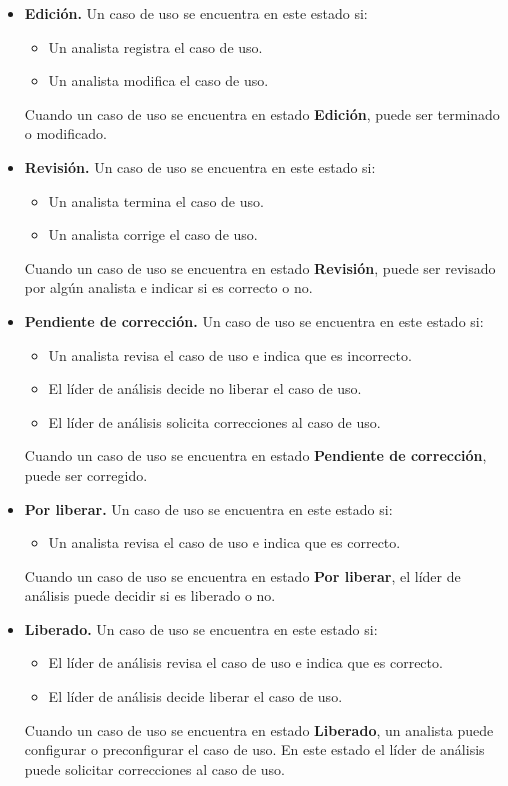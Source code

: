 \begin{itemize}
 \item {\bf Edición.} Un caso de uso se encuentra en este estado si:
 \begin{itemize}
  \item Un analista registra el caso de uso.
  \item Un analista modifica el caso de uso.
 \end{itemize}
 Cuando un caso de uso se encuentra en estado {\bf Edición}, puede ser terminado o modificado.
 
 \item {\bf Revisión.} Un caso de uso se encuentra en este estado si:
 \begin{itemize}
  \item Un analista termina el caso de uso.
  \item Un analista corrige el caso de uso.
 \end{itemize}
 
 Cuando un caso de uso se encuentra en estado {\bf Revisión}, puede ser revisado por algún analista e indicar si es correcto o no. 

 \item {\bf Pendiente de corrección.} Un caso de uso se encuentra en este estado si:
 \begin{itemize}
  \item Un analista revisa el caso de uso e indica que es incorrecto.
  \item El líder de análisis decide no liberar el caso de uso.
  \item El líder de análisis solicita correcciones al caso de uso.
 \end{itemize}
 Cuando un caso de uso se encuentra en estado {\bf Pendiente de corrección}, puede ser corregido.

 \item {\bf Por liberar.} Un caso de uso se encuentra en este estado si:
 \begin{itemize}
  \item Un analista revisa el caso de uso e indica que es correcto.
 \end{itemize}
 Cuando un caso de uso se encuentra en estado {\bf Por liberar}, el líder de análisis puede decidir si es liberado o no.

 \item {\bf Liberado.} Un caso de uso se encuentra en este estado si:
 \begin{itemize}
  \item El líder de análisis revisa el caso de uso e indica que es correcto.
  \item El líder de análisis decide liberar el caso de uso.
 \end{itemize}
 Cuando un caso de uso se encuentra en estado {\bf Liberado}, un analista puede configurar o preconfigurar el caso de uso. En este estado el líder de análisis puede solicitar correcciones al caso de uso.
 

\end{itemize}
